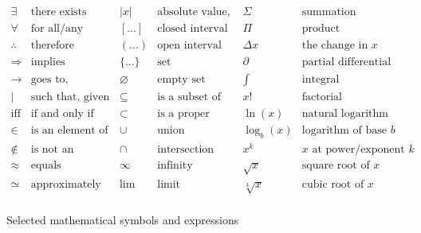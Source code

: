\begin{table}%

$$
\begin{array}{rlrlrlrl}
\exists  	    & \text{there exists}	            & |x|      	  & \text{absolute value, determinant}			& \Sigma      & \text{summation}              \\
\forall		    & \text{for all/any}	            & [...]       & \text{closed interval}			            & \Pi         &  \text{product}               \\
\therefore		& \text{therefore}	              & (...)       & \text{open interval}    				        & \Delta x    & \text{the change in } x       \\
\Rightarrow		& \text{implies}			            & \{...\}     & \text{set}	                  			    & \partial	  & \text{partial differential}   \\
\to  & \text{goes to, approaches}  	            & \varnothing & \text{empty set}      		              & \int		    & \text{integral}               \\
\mid          & \text{such that, given}     	  & \subseteq   & \text{is a subset of}       			      & x!		      & \text{factorial}              \\
\text{iff}    & \text{if and only if}			      & \subset     & \text{is a proper subset of}			      & \ln(x)	    & \text{natural logarithm}      \\
\in           & \text{is an element of}		      & \cup        &	\text{union}                            & \log_b(x)		& \text{logarithm of base } b   \\
\notin        & \text{is not an element of} 		& \cap		    &	\text{intersection}                     &	x^k   	    & x \text{ at power/exponent } k\\
\approx       & \text{equals approximately}     & \infty      & \text{infinity}                         & \sqrt{x}    & \text{square root of } x      \\
\simeq        & \text{approximately equal to}   & \lim        & \text{limit}                            & \sqrt[3]{x} & \text{cubic root of } x       \\
\end{array}
$$
  
  \caption{Selected mathematical symbols and expressions}\label{tbl:math}
\end{table}
